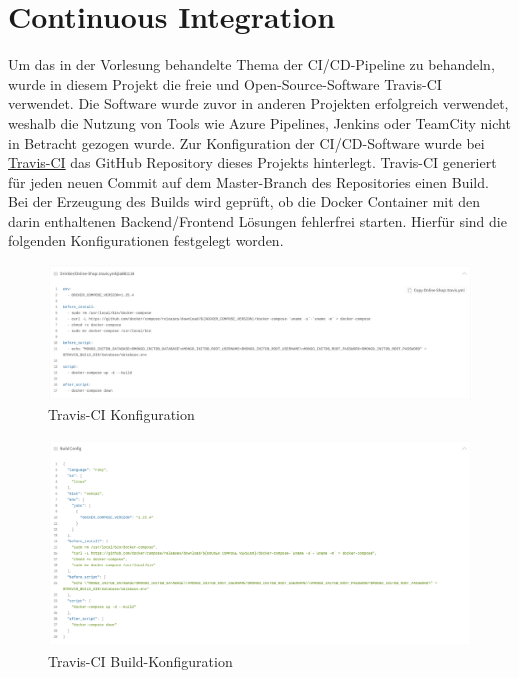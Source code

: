 \chapter{Continuous Integration}\label{ch:continuous-integration}

Um das in der Vorlesung behandelte Thema der CI/CD-Pipeline zu behandeln, wurde in diesem Projekt die freie und Open-Source-Software Travis-CI verwendet. Die Software wurde zuvor in anderen Projekten erfolgreich verwendet, weshalb die Nutzung von Tools wie Azure Pipelines, Jenkins oder TeamCity nicht in Betracht gezogen wurde.
Zur Konfiguration der CI/CD-Software wurde bei \hyperlink{https://travis-ci.com/}{Travis-CI} das GitHub Repository dieses Projekts hinterlegt. Travis-CI generiert für jeden neuen Commit auf dem Master-Branch des Repositories einen Build. Bei der Erzeugung des Builds wird geprüft, ob die Docker Container mit den darin enthaltenen Backend/Frontend Lösungen fehlerfrei starten. Hierfür sind die folgenden Konfigurationen festgelegt worden.

\begin{figure}[H]
 \centering
 \includegraphics[width=\textwidth,height=0.6\textheight,keepaspectratio]{images/Travis-CI-conf.png}
 \caption{Travis-CI Konfiguration}
 \label{fig:ci-conf}
\end{figure}

\begin{figure}[h]
 \centering
 \includegraphics[width=\textwidth,height=0.6\textheight,keepaspectratio]{images/Build-conf.png}
 \caption{Travis-CI Build-Konfiguration}
 \label{fig:build-conf}
\end{figure}
